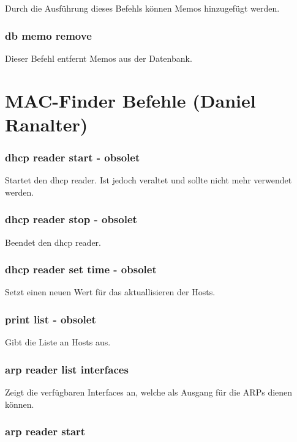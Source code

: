 \documentclass[12pt,a4paper]{report}
\begin{document}
\begin{onehalfspace}
Durch die Ausführung dieses Befehls können Memos hinzugefügt werden.

\subsubsection{db memo remove}

Dieser Befehl entfernt Memos aus der Datenbank.

\newpage
\section{MAC-Finder Befehle (Daniel Ranalter)}

\subsubsection{dhcp reader start - obsolet}

Startet den dhcp reader. Ist jedoch veraltet und sollte nicht mehr verwendet werden.

\subsubsection{dhcp reader stop - obsolet}

Beendet den dhcp reader.

\subsubsection{dhcp reader set time - obsolet}

Setzt einen neuen Wert für das aktuallisieren der Hosts.

\subsubsection{print list - obsolet}

Gibt die Liste an Hosts aus.

\subsubsection{arp reader list interfaces}

Zeigt die verfügbaren Interfaces an, welche als Ausgang für die ARPs dienen können.

\subsubsection{arp reader start}


\end{onehalfspace}
\end{document}
